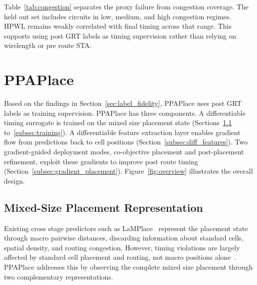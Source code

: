 \documentclass[sigconf,anonymous,review,9pt]{acmart}
\begin{document}
Table~\ref{tab:congestion} separates the proxy failure from congestion
coverage. The held out set includes circuits in low, medium, and high
congestion regimes. HPWL remains weakly correlated with final timing
across that range. This supports using post GRT labels as timing
supervision rather than relying on wirelength or pre route STA.


\section{PPAPlace}
\label{sec:method}

Based on the findings in Section~\ref{sec:label_fidelity}, PPAPlace
uses post GRT labels as training supervision. PPAPlace has three
components. A differentiable timing surrogate is trained on the mixed
size placement state
(Sections~\ref{subsec:representation} to~\ref{subsec:training}). A
differentiable feature extraction layer enables gradient flow from
predictions back to cell positions
(Section~\ref{subsec:diff_features}). Two gradient-guided deployment
modes, co-objective placement and post-placement refinement, exploit
these gradients to improve post route timing
(Section~\ref{subsec:gradient_placement}).
Figure~\ref{fig:overview} illustrates the overall design.


\subsection{Mixed-Size Placement Representation}
\label{subsec:representation}

Existing cross stage predictors such as LaMPlace~\cite{lamplace2025} represent the
placement state through macro pairwise distances, discarding information
about standard cells, spatial density, and routing congestion. However,
timing violations are largely affected by
standard cell placement and routing, not macro positions
alone~\cite{chipbench2025}. PPAPlace addresses this by observing the
complete mixed size placement through two complementary representations.
\end{document}

